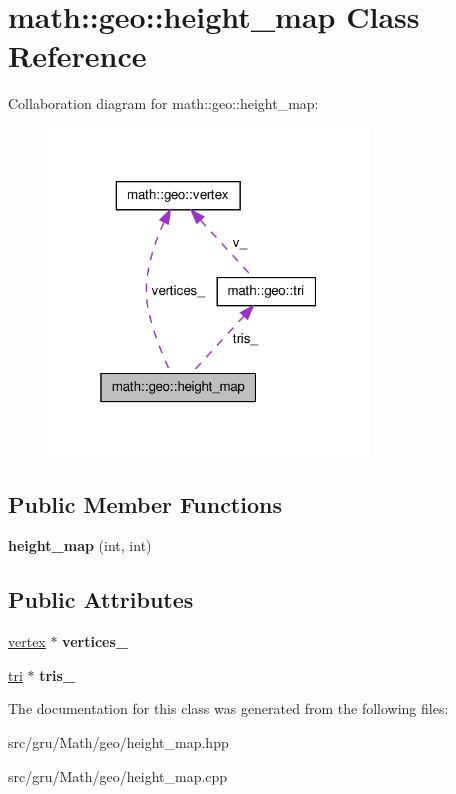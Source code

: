\hypertarget{classmath_1_1geo_1_1height__map}{\section{math\-:\-:geo\-:\-:height\-\_\-map \-Class \-Reference}
\label{classmath_1_1geo_1_1height__map}
}


\-Collaboration diagram for math\-:\-:geo\-:\-:height\-\_\-map\-:
\nopagebreak
\begin{figure}[H]
\begin{center}
\leavevmode
\includegraphics[width=241pt]{classmath_1_1geo_1_1height__map__coll__graph}
\end{center}
\end{figure}
\subsection*{\-Public \-Member \-Functions}
\begin{DoxyCompactItemize}
\item 
\hypertarget{classmath_1_1geo_1_1height__map_a56685f77f9750167f419366039118113}{{\bfseries height\-\_\-map} (int, int)}\label{classmath_1_1geo_1_1height__map_a56685f77f9750167f419366039118113}

\end{DoxyCompactItemize}
\subsection*{\-Public \-Attributes}
\begin{DoxyCompactItemize}
\item 
\hypertarget{classmath_1_1geo_1_1height__map_add2b5f09f8bf6a3d7c674afd0fcb0ee4}{\hyperlink{classmath_1_1geo_1_1vertex}{vertex} $\ast$ {\bfseries vertices\-\_\-}}\label{classmath_1_1geo_1_1height__map_add2b5f09f8bf6a3d7c674afd0fcb0ee4}

\item 
\hypertarget{classmath_1_1geo_1_1height__map_a29abf1041ebd17777d88a2b55ef82535}{\hyperlink{classmath_1_1geo_1_1tri}{tri} $\ast$ {\bfseries tris\-\_\-}}\label{classmath_1_1geo_1_1height__map_a29abf1041ebd17777d88a2b55ef82535}

\end{DoxyCompactItemize}


\-The documentation for this class was generated from the following files\-:\begin{DoxyCompactItemize}
\item 
src/gru/\-Math/geo/height\-\_\-map.\-hpp\item 
src/gru/\-Math/geo/height\-\_\-map.\-cpp\end{DoxyCompactItemize}
